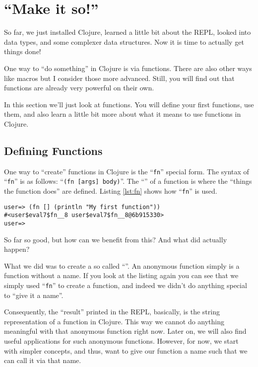 \section{``Make it so!''}
So far, we just installed Clojure, learned a little bit about the REPL, looked into data types, and some complexer data structures.
Now it is time to actually get things done!

One way to ``do something'' in Clojure is via functions.
There are also other ways like macros but I consider those more advanced.
Still, you will find out that functions are already very powerful on their own.

In this section we'll just look at functions.
You will define your first functions, use them, and also learn a little bit more about what it means to use functions in Clojure.

\subsection{Defining Functions}
One way to ``create'' functions in Clojure is the ``\texttt{fn}'' special form.
The syntax of ``\texttt{fn}'' is as follows: ``\texttt{(fn [args] body)}''.
The ``'' of a function is where the ``things the function does'' are defined.
Listing \vref{lst:fn} shows how ``\texttt{fn}'' is used.

\begin{lstlisting}[label=lst:fn, caption=Usage of fn]
user=> (fn [] (println "My first function"))
#<user$eval7$fn__8 user$eval7$fn__8@6b915330>
user=> 
\end{lstlisting}

So far so good, but how can we benefit from this?
And what did actually happen?

What we did was to create a so called ``''.
An anonymous function simply is a function without a name.
If you look at the listing again you can see that we simply used ``\texttt{fn}'' to create a function, and indeed we didn't do anything special to ``give it a name''.

Consequently, the ``result'' printed in the REPL, basically, is the string representation of a function in Clojure.
This way we cannot do anything meaningful with that anonymous function right now.
Later on, we will also find useful applications for such anonymous functions.
However, for now, we start with simpler concepts, and thus, want to give our function a name such that we can call it via that name.

